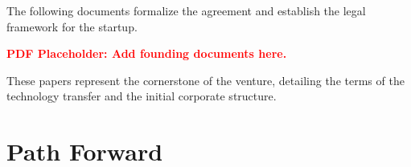 \begin{tcolorbox}[
    enhanced,
    breakable, %
    colback=accent!25, %
    colframe=accent!70!black, %
    boxrule=0.8pt,
    arc=1mm,
    title={\textbf{\color{white}Legal Framework}},
    fonttitle=\bfseries,
    coltitle=accent!50!primary %
]
The following documents formalize the agreement and establish the legal framework for the startup. 


\begin{center}
%  
\textcolor{red}{\textbf{PDF Placeholder: Add founding documents here.}}
\end{center}
\vspace{0.5cm}

These papers represent the cornerstone of the venture, detailing the terms of the technology transfer and the initial corporate structure.
\end{tcolorbox}

\vspace{1cm} %

\section{Path Forward}

